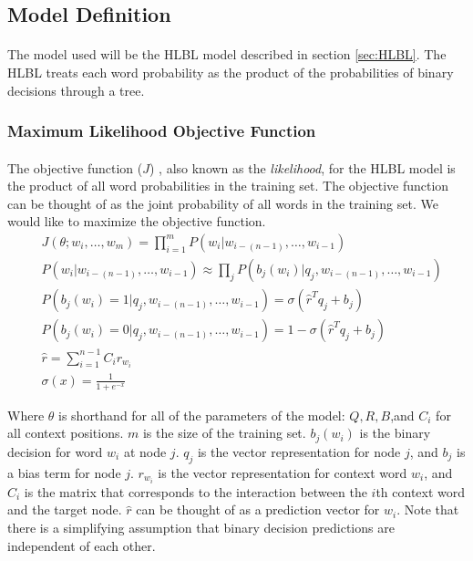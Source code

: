 \documentclass[12pt]{ociamthesis}  %
\begin{document}
\subsection{Model Definition}
\paragraph{}
The model used will be the HLBL model described in section \ref{sec:HLBL}. The HLBL treats each word probability as the product of the probabilities of binary decisions through a tree.

\subsubsection{Maximum Likelihood Objective Function}
\paragraph{}
The objective function ($J$) , also known as the \emph{likelihood}, for the HLBL model is the product of all word probabilities in the training set. The objective function can be thought of as the joint probability of all words in the training set. We would like to maximize the objective function. 
\begin{align}
&J(\theta;w_i,\dots, w_m) = \prod_{i=1}^{m} P(w_i | w_{i-(n-1)},\dots, w_{i-1})
\\
&P(w_i | w_{i-(n-1)},\dots, w_{i-1})  \approx \prod_j P(b_j(w_i) | q_j, w_{i-(n-1)},\dots, w_{i-1})
\\ 
&P(b_j(w_i) = 1 | q_j, w_{i-(n-1)},\dots, w_{i-1}) =  \sigma( \hat{r}^T q_{j} +b_{j}) \nonumber
\\ 
&P(b_j(w_i) = 0 | q_j, w_{i-(n-1)},\dots, w_{i-1}) =  1- \sigma( \hat{r}^T q_{j} +b_{j}) \nonumber
\\ 
&\hat{r} = \sum_{i=1}^{n-1} C_i r_{w_i} \nonumber
\\  
&\sigma(x) = \frac{1}{1+e^{-x}} \label{eq:sigmoid} \nonumber
\end{align}

Where $\theta$ is shorthand for all of the parameters of the model: $Q,R,B$,and $C_i$ for all context positions. $m$ is the size of the training set.  $b_j(w_i)$ is the binary decision for word $w_i$ at node $j$. $q_j$ is the vector representation for node $j$, and $b_{j}$ is a bias term for node $j$. $r_{w_i}$ is the vector representation for context word $w_i$, and $C_i$ is the matrix that corresponds to the interaction between the $i$th context word and the target node.  $\hat{r}$ can be thought of as a prediction vector for $w_i$. Note that there is a simplifying assumption that binary decision predictions are independent of each other.
\end{document}
